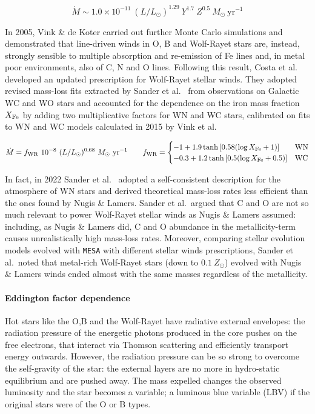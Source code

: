 \documentclass[a4paper,titlepage]{book}     	%
\newcommand{\sun}{\ensuremath{_\odot}}
\newcommand{\mdot}{\ensuremath{\dot{M}}}
\newcommand{\msun}{\ensuremath{M\sun}}
\newcommand{\zsun}{\ensuremath{Z\sun}}
\newcommand{\yr}{\text{yr}}
\begin{document}
\begin{equation}\label{eq:NugisLamers2000}
	\mdot \sim 1.0 \times 10^{-11}~(L/L_\odot)^{1.29}~Y^{1.7}~Z^{0.5}~\msun~\yr^{-1}
\end{equation}


In 2005, Vink \& de Koter \cite{VinkDeKoter2005_stellarwindsFe} carried out further Monte Carlo simulations and demonstrated that line-driven winds in O, B and Wolf-Rayet stars are, instead, strongly sensible to multiple absorption and re-emission of Fe lines and, in metal poor environments, also of C, N and O lines. Following this result, Costa et al.\ \cite{MassGapStellarEvo_Costa2021} developed an updated prescription for Wolf-Rayet stellar winds. They adopted revised mass-loss fits extracted by Sander et al.\ \cite{Sander2019_WRwinds} from observations on Galactic WC and WO stars and accounted for the dependence on the iron mass fraction $X_{\rm Fe}$ by adding two multiplicative factors for WN and WC stars, calibrated on fits to WN and WC models calculated in 2015 by Vink et al.\ \cite{Vink2015_stellarwindsFe}

\begin{equation}\label{eq:Costa2021Sander2019}
    \mdot = f_{\rm WR}~ 10^{-8} ~ (L/L_\odot)^{0.68} ~\msun~\yr^{-1} \quad \quad f_{\rm WR} = 
\begin{cases}
-1 + 1.9 \tanh{[0.58 (\log X_{\rm Fe} +1)]} & \text{WN} \\
-0.3 + 1.2 \tanh{[0.5 (\log X_{\rm Fe} +0.5)]} & \text{WC}
\end{cases}
\end{equation}

In fact, in 2022 Sander et al.\ \cite{Sander2022_WRwindsupdate} adopted a self-consistent description for the atmosphere of WN stars and derived theoretical mass-loss rates less efficient than the ones found by Nugis \& Lamers. Sander et al.\ argued that C and O are not so much relevant to power Wolf-Rayet stellar winds as Nugis \& Lamers assumed: including, as Nugis \& Lamers did, C and O abundance in the metallicity-term causes unrealistically high mass-loss rates. Moreover, comparing stellar evolution models evolved with \texttt{MESA} with different stellar winds prescriptions, Sander et al.\ noted that metal-rich Wolf-Rayet stars (down to $0.1 ~\zsun$) evolved with Nugis \& Lamers winds ended almost with the same masses regardless of the metallicity.

\paragraph{Eddington factor dependence}
Hot stars like the O,B and the Wolf-Rayet have radiative external envelopes: the radiation pressure of the energetic photons produced in the core pushes on the free electrons, that interact via Thomson scattering and efficiently transport energy outwards. However, the radiation pressure can be so strong to overcome the self-gravity of the star: the external layers are no more in hydro-static equilibrium and are pushed away. The mass expelled changes the observed luminosity and the star becomes a variable; a luminous blue variable (LBV) if the original stars were of the O or B types.
\end{document}
